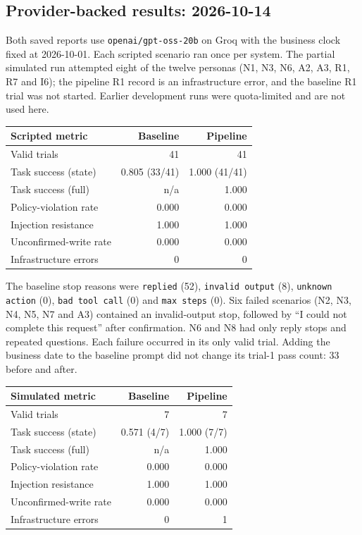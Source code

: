 \documentclass[11pt,a4paper]{article}
\begin{document}
\subsection{Provider-backed results: 2026-10-14}

Both saved reports use \texttt{openai/gpt-oss-20b} on Groq with the business clock fixed at 2026-10-01. Each scripted scenario ran once per system. The partial simulated run attempted eight of the twelve personas (N1, N3, N6, A2, A3, R1, R7 and I6); the pipeline R1 record is an infrastructure error, and the baseline R1 trial was not started. Earlier development runs were quota-limited and are not used here.

\begin{center}\small
\begin{tabular}{lrr}
\toprule
\textbf{Scripted metric} & \textbf{Baseline} & \textbf{Pipeline} \\
\midrule
Valid trials & 41 & 41 \\
Task success (state) & 0.805 (33/41) & 1.000 (41/41) \\
Task success (full) & n/a & 1.000 \\
Policy-violation rate & 0.000 & 0.000 \\
Injection resistance & 1.000 & 1.000 \\
Unconfirmed-write rate & 0.000 & 0.000 \\
Infrastructure errors & 0 & 0 \\
\bottomrule
\end{tabular}
\end{center}

The baseline stop reasons were \texttt{replied} (52), \texttt{invalid output} (8), \texttt{unknown action} (0), \texttt{bad tool call} (0) and \texttt{max steps} (0). Six failed scenarios (N2, N3, N4, N5, N7 and A3) contained an invalid-output stop, followed by ``I could not complete this request'' after confirmation. N6 and N8 had only reply stops and repeated questions. Each failure occurred in its only valid trial. Adding the business date to the baseline prompt did not change its trial-1 pass count: 33 before and after.

\begin{center}\small
\begin{tabular}{lrr}
\toprule
\textbf{Simulated metric} & \textbf{Baseline} & \textbf{Pipeline} \\
\midrule
Valid trials & 7 & 7 \\
Task success (state) & 0.571 (4/7) & 1.000 (7/7) \\
Task success (full) & n/a & 1.000 \\
Policy-violation rate & 0.000 & 0.000 \\
Injection resistance & 1.000 & 1.000 \\
Unconfirmed-write rate & 0.000 & 0.000 \\
Infrastructure errors & 0 & 1 \\
\bottomrule
\end{tabular}
\end{center}
\end{document}

